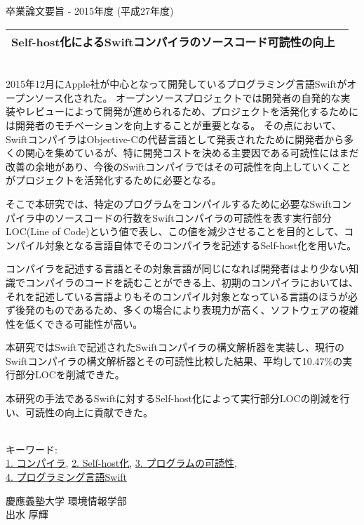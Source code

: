 卒業論文要旨 - 2015年度 (平成27年度)
\begin{center}
\begin{large}
\begin{tabular}{|M{0.97\linewidth}|}
    \hline
    Self-host化によるSwiftコンパイラのソースコード可読性の向上\\
    \hline
\end{tabular}
\end{large}
\end{center}

~ \\

2015年12月にApple社が中心となって開発しているプログラミング言語Swiftがオープンソース化された。
オープンソースプロジェクトでは開発者の自発的な実装やレビューによって開発が進められるため、プロジェクトを活発化するためには開発者のモチベーションを向上することが重要となる。
その点において、SwiftコンパイラはObjective-Cの代替言語として発表されたために開発者から多くの関心を集めているが、特に開発コストを決める主要因である可読性にはまだ改善の余地があり、今後のSwiftコンパイラではその可読性を向上していくことがプロジェクトを活発化するために必要となる。

そこで本研究では、特定のプログラムをコンパイルするために必要なSwiftコンパイラ中のソースコードの行数をSwiftコンパイラの可読性を表す実行部分LOC(Line of Code)という値で表し、この値を減少させることを目的として、コンパイル対象となる言語自体でそのコンパイラを記述するSelf-host化を用いた。

コンパイラを記述する言語とその対象言語が同じになれば開発者はより少ない知識でコンパイラのコードを読むことができる上、初期のコンパイラにおいては、それを記述している言語よりもそのコンパイル対象となっている言語のほうが必ず後発のものであるため、多くの場合により表現力が高く、ソフトウェアの複雑性を低くできる可能性が高い。

本研究ではSwiftで記述されたSwiftコンパイラの構文解析器を実装し、現行のSwiftコンパイラの構文解析器とその可読性比較した結果、平均して10.47\%の実行部分LOCを削減できた。

本研究の手法であるSwiftに対するSelf-host化によって実行部分LOCの削減を行い、可読性の向上に貢献できた。

~ \\
キーワード:\\
\underline{1. コンパイラ},
\underline{2. Self-host化},
\underline{3. プログラムの可読性},\\
\underline{4. プログラミング言語Swift}
\begin{flushright}
慶應義塾大学 環境情報学部\\
出水 厚輝
\end{flushright}
